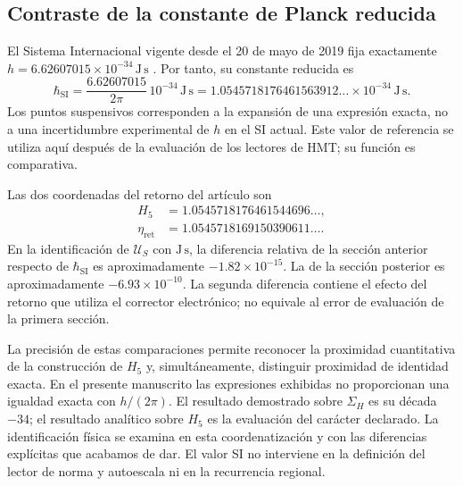 \subsection{Contraste de la constante de Planck reducida}
\label{sec:revision-planck-contraste}

El Sistema Internacional vigente desde el 20 de mayo de 2019 fija
exactamente \(h=6.62607015\times10^{-34}\,\mathrm{J\,s}\)
\cite{bipm2018}. Por tanto, su constante reducida es
\[
 \hbar_{\mathrm{SI}}=\frac{6.62607015}{2\pi}\,10^{-34}\,
 \mathrm{J\,s}
 =1.0545718176461563912\ldots\times10^{-34}\,\mathrm{J\,s}.
\]
Los puntos suspensivos corresponden a la expansión de una expresión
exacta, no a una incertidumbre experimental de \(h\) en el SI actual.
Este valor de referencia se utiliza aquí después de la evaluación de
los lectores de HMT; su función es comparativa.

Las dos coordenadas del retorno del artículo son
\begin{align*}
 H_5&=1.0545718176461544696\ldots,\\
 \eta_{\mathrm{ret}}&=1.0545718169150390611\ldots.
\end{align*}
En la identificación de \(\mathcal U_S\) con \(\mathrm{J\,s}\), la
diferencia relativa de la sección anterior respecto de
\(\hbar_{\mathrm{SI}}\) es aproximadamente \(-1.82\times10^{-15}\).
La de la sección posterior es aproximadamente \(-6.93\times10^{-10}\).
La segunda diferencia contiene el efecto del retorno que utiliza el
corrector electrónico; no equivale al error de evaluación de la
primera sección.

La precisión de estas comparaciones permite reconocer la proximidad
cuantitativa de la construcción de \(H_5\) y, simultáneamente, distinguir
proximidad de identidad exacta. En el presente manuscrito las expresiones
exhibidas no proporcionan una igualdad exacta con \(h/(2\pi)\).
El resultado demostrado sobre \(\Sigma_H\) es su década \(-34\);
el resultado analítico sobre \(H_5\) es la evaluación del carácter
declarado. La identificación física se examina en esta coordenatización y con las
diferencias explícitas que acabamos de dar. El valor SI no interviene
en la definición del lector de norma y autoescala ni en la recurrencia regional.
